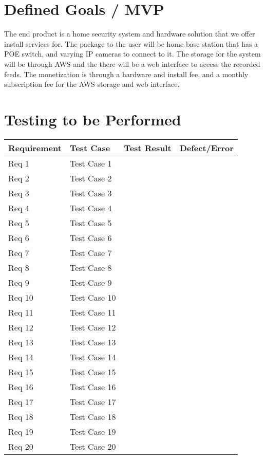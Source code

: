 \documentclass{report}
\begin{document}
\chapter{Defined Goals / MVP}
The end product is a home security system and hardware solution that we offer install services for. 
The package to the user will be home base station that has a POE switch, and varying IP cameras to connect to it. 
The storage for the system will be through AWS and the there will be a web interface to access the recorded feeds. 
The monetization is through a hardware and install fee, and a monthly subscription fee for the AWS storage and web interface. 


\chapter{Testing to be Performed}
\begin{tabular}{|l|l|l|l|}
\hline
Requirement & Test Case & Test Result & Defect/Error \\
\hline
Req 1 & Test Case 1 &  &  \\
\hline
Req 2 & Test Case 2 &  &  \\
\hline
Req 3 & Test Case 3 &  &  \\
\hline
Req 4 & Test Case 4 &  &  \\
\hline
Req 5 & Test Case 5 &  &  \\
\hline
Req 6 & Test Case 6 &  &  \\
\hline
Req 7 & Test Case 7 &  &  \\
\hline
Req 8 & Test Case 8 &  &  \\
\hline
Req 9 & Test Case 9 &  &  \\
\hline
Req 10 & Test Case 10 &  &  \\
\hline
Req 11 & Test Case 11 &  &  \\
\hline
Req 12 & Test Case 12 &  &  \\
\hline
Req 13 & Test Case 13 &  &  \\
\hline
Req 14 & Test Case 14 &  &  \\
\hline
Req 15 & Test Case 15 &  &  \\
\hline
Req 16 & Test Case 16 &  &  \\
\hline
Req 17 & Test Case 17 &  &  \\
\hline
Req 18 & Test Case 18 &  &  \\
\hline
Req 19 & Test Case 19 &  &  \\
\hline
Req 20 & Test Case 20 &  &  \\
\hline
\end{tabular}
\end{document}

